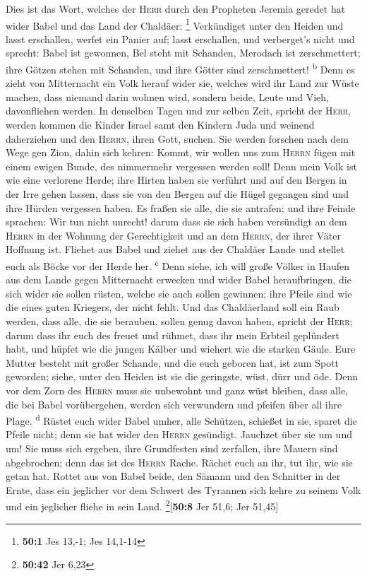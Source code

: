  Dies ist das Wort, welches der \textsc{Herr} durch den
Propheten Jeremia geredet hat wider Babel und das Land der Chaldäer:
\footnote{\textbf{50:1} Jes 13,-1; Jes 14,1-14} 
Verkündiget unter den Heiden und lasst erschallen, werfet ein Panier
auf; lasst erschallen, und verberget's nicht und sprecht: Babel ist
gewonnen, Bel steht mit Schanden, Merodach ist zerschmettert; ihre
Götzen stehen mit Schanden, und ihre Götter sind zerschmettert!
\textsuperscript{b}  Denn es zieht von Mitternacht ein
Volk herauf wider sie, welches wird ihr Land zur Wüste machen, dass
niemand darin wohnen wird, sondern beide, Leute und Vieh, davonfliehen
werden.  In denselben Tagen und zur selben Zeit, spricht
der \textsc{Herr}, werden kommen die Kinder Israel samt den Kindern Juda
und weinend daherziehen und den \textsc{Herrn}, ihren Gott, suchen.
 Sie werden forschen nach dem Wege gen Zion, dahin sich
kehren: Kommt, wir wollen uns zum \textsc{Herrn} fügen mit einem ewigen
Bunde, des nimmermehr vergessen werden soll!  Denn mein
Volk ist wie eine verlorene Herde; ihre Hirten haben sie verführt und
auf den Bergen in der Irre gehen lassen, dass sie von den Bergen auf die
Hügel gegangen sind und ihre Hürden vergessen haben.  Es
fraßen sie alle, die sie antrafen; und ihre Feinde sprachen: Wir tun
nicht unrecht! darum dass sie sich haben versündigt an dem
\textsc{Herrn} in der Wohnung der Gerechtigkeit und an dem
\textsc{Herrn}, der ihrer Väter Hoffnung ist.  Fliehet aus
Babel und ziehet aus der Chaldäer Lande und stellet euch als Böcke vor
der Herde her. \textsuperscript{c}  Denn siehe, ich will
große Völker in Haufen aus dem Lande gegen Mitternacht erwecken und
wider Babel heraufbringen, die sich wider sie sollen rüsten, welche sie
auch sollen gewinnen; ihre Pfeile sind wie die eines guten Kriegers, der
nicht fehlt.  Und das Chaldäerland soll ein Raub werden,
dass alle, die sie berauben, sollen genug davon haben, spricht der
\textsc{Herr};  darum dass ihr euch des freuet und
rühmet, dass ihr mein Erbteil geplündert habt, und hüpfet wie die jungen
Kälber und wiehert wie die starken Gäule.  Eure Mutter
besteht mit großer Schande, und die euch geboren hat, ist zum Spott
geworden; siehe, unter den Heiden ist sie die geringste, wüst, dürr und
öde.  Denn vor dem Zorn des \textsc{Herrn} muss sie
unbewohnt und ganz wüst bleiben, dass alle, die bei Babel vorübergehen,
werden sich verwundern und pfeifen über all ihre Plage.
\textsuperscript{d}  Rüstet euch wider Babel umher, alle
Schützen, schießet in sie, sparet die Pfeile nicht; denn sie hat wider
den \textsc{Herrn} gesündigt.  Jauchzet über sie um und
um! Sie muss sich ergeben, ihre Grundfesten sind zerfallen, ihre Mauern
sind abgebrochen; denn das ist des \textsc{Herrn} Rache. Rächet euch an
ihr, tut ihr, wie sie getan hat.  Rottet aus von Babel
beide, den Sämann und den Schnitter in der Ernte, dass ein jeglicher vor
dem Schwert des Tyrannen sich kehre zu seinem Volk und ein jeglicher
fliehe in sein Land. \footnote{\textbf{50:42} Jer 6,23}{[}\textbf{50:8}
Jer 51,6; Jer 51,45{]}

